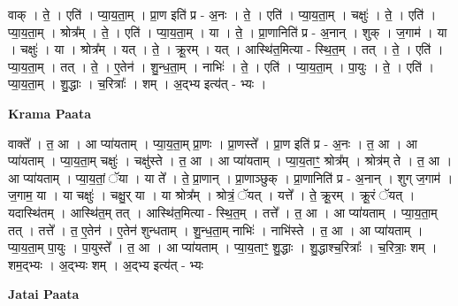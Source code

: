 \documentclass[17pt]{extarticle}
\begin{document}
वाक् । ते॒ । एति॑ । प्या॒य॒ता॒म् । प्रा॒ण इति॑ प्र - अ॒नः । ते॒ । एति॑ । प्या॒य॒ता॒म् । चक्षुः॑ । ते॒ । एति॑ । प्या॒य॒ता॒म् । श्रोत्र᳚म् । ते॒ । एति॑ । प्या॒य॒ता॒म् । या । ते॒ । प्रा॒णानिति॑ प्र - अ॒नान् । शुक् । ज॒गाम॑ । या । चक्षुः॑ । या । श्रोत्र᳚म् । यत् । ते॒ । क्रू॒रम् । यत् । आस्थि॑त॒मित्या - स्थि॒त॒म् । तत् । ते॒ । एति॑ । प्या॒य॒ता॒म् । तत् । ते॒ । ए॒तेन॑ । शु॒न्ध॒ता॒म् । नाभिः॑ । ते॒ । एति॑ । प्या॒य॒ता॒म् । पा॒युः । ते॒ । एति॑ । प्या॒य॒ता॒म् । शु॒द्धाः । च॒रित्राः᳚ । शम् । अ॒द्भ्य इत्य॑त् - भ्यः ।  \newline


\textbf{Krama Paata} \newline

वाक्ते᳚ । त॒ आ । आ प्या॑यताम् । प्या॒य॒ता॒म् प्रा॒णः । प्रा॒णस्ते᳚ । प्रा॒ण इति॑ प्र - अ॒नः । त॒ आ । आ प्या॑यताम् । प्या॒य॒ता॒म् चक्षुः॑ । चक्षु॑स्ते । त॒ आ । आ प्या॑यताम् । प्या॒य॒ताꣳ॒॒ श्रोत्र᳚म् । श्रोत्र॑म् ते । त॒ आ । आ प्या॑यताम् । प्या॒य॒तां॒ ॅया । या ते᳚ । ते॒ प्रा॒णान् । प्रा॒णाञ्छुक् । प्रा॒णानिति॑ प्र - अ॒नान् । शुग् ज॒गाम॑ । ज॒गाम॒ या । या चक्षुः॑ । चक्षु॒र् या । या श्रोत्र᳚म् । श्रोत्रं॒ ॅयत् । यत्ते᳚ । ते॒ क्रू॒रम् । क्रू॒रं ॅयत् । यदास्थि॑तम् । आस्थि॑त॒म् तत् । आस्थि॑त॒मित्या - स्थि॒त॒म् । तत्ते᳚ । त॒ आ । आ प्या॑यताम् । प्या॒य॒ता॒म् तत् । तत्ते᳚ । त॒ ए॒तेन॑ । ए॒तेन॑ शुन्धताम् । शु॒न्ध॒ता॒म् नाभिः॑ । नाभि॑स्ते । त॒ आ । आ प्या॑यताम् । प्या॒य॒ता॒म् पा॒युः । पा॒युस्ते᳚ । त॒ आ । आ प्या॑यताम् । प्या॒य॒ताꣳ॒॒ शु॒द्धाः । शु॒द्धाश्च॒रित्राः᳚ । च॒रित्राः॒ शम् । शम॒द्भ्यः । अ॒द्भ्यः शम् । अ॒द्भ्य इत्य॑त् - भ्यः \newline

\textbf{Jatai Paata} \newline
\end{document}
